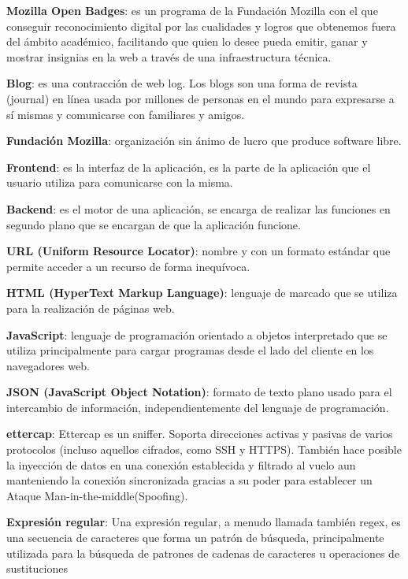 \textbf{Mozilla Open Badges}: es un programa de la Fundación Mozilla con el que conseguir reconocimiento digital por las cualidades y logros que obtenemos fuera del ámbito académico, facilitando que quien lo desee pueda emitir, ganar y mostrar insignias en la web a través de una infraestructura técnica.
\bigskip

\textbf{Blog}: es una contracción de web log. Los blogs son una forma de revista (journal) en línea usada por millones de personas en el mundo para expresarse a sí mismas y comunicarse con familiares y amigos.
\bigskip

\textbf{Fundación Mozilla}: organización sin ánimo de lucro que produce software libre.
\bigskip

\textbf{Frontend}: es la interfaz de la aplicación, es la parte de la aplicación que el usuario utiliza para comunicarse con la misma.
\bigskip

\textbf{Backend}: es el motor de una aplicación, se encarga de realizar las funciones en segundo plano que se encargan de que la aplicación funcione.
\bigskip

\textbf{URL (Uniform Resource Locator)}: nombre y con un formato estándar que permite acceder a un recurso de forma inequívoca.
\bigskip

\textbf{HTML (HyperText Markup Language)}: lenguaje de marcado que se utiliza para la realización de páginas web.
\bigskip

\textbf{JavaScript}: lenguaje de programación orientado a objetos interpretado que se utiliza principalmente para cargar programas desde el lado del cliente en los navegadores web.
\bigskip

\textbf{JSON (JavaScript Object Notation)}: formato de texto plano usado para el intercambio de información, independientemente del lenguaje de programación.
\bigskip

\textbf{ettercap}: Ettercap es un sniffer. Soporta direcciones activas y pasivas de varios protocolos (incluso aquellos cifrados, como SSH y HTTPS). También hace posible la inyección de datos en una conexión establecida y filtrado al vuelo aun manteniendo la conexión sincronizada gracias a su poder para establecer un Ataque Man-in-the-middle(Spoofing).
\bigskip

\textbf{Expresión regular}: Una expresión regular, a menudo llamada también regex, es una secuencia de caracteres que forma un patrón de búsqueda, principalmente utilizada para la búsqueda de patrones de cadenas de caracteres u operaciones de sustituciones
\bigskip

